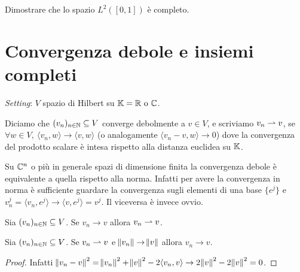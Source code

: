 \begin{exercise}
    Dimostrare che lo spazio $ L^2([0, 1]) $ è completo.
\end{exercise}

%
%

\section{Convergenza debole e insiemi completi}
\emph{Setting}: $ V $ spazio di Hilbert su $ \mathbb{K} = \mathbb{R} \text{ o } \mathbb{C} $.

\begin{definition}
    Diciamo che $ (v_n)_{n \in \mathbb{N}} \subseteq V $ converge debolmente a $ v \in V $, e scriviamo $ v_n \rightharpoonup v $, se $ \forall w \in V, \ {\langle v_n, w \rangle} \to {\langle v, w \rangle} $ (o analogamente $ {\langle v_n - v, w \rangle} \to 0 $) dove la convergenza del prodotto scalare è intesa rispetto alla distanza euclidea su $ \mathbb{K} $. 
\end{definition}

\begin{oss}
    Su $ \mathbb{C}^n $ o più in generale spazi di dimensione finita la convergenza debole è equivalente a quella rispetto alla norma. Infatti per avere la convergenza in norma è sufficiente guardare la convergenza sugli elementi di una base $ \{e^j\} $ e $ v_n^j = {\langle v_n, e^j\rangle} \to {\langle v, e^j\rangle} = v^j $. Il viceversa è invece ovvio.
\end{oss}

\begin{lemma}
    Sia $ (v_n)_{n \in \mathbb{N}} \subseteq V $. Se $ v_n \to v $ allora $ v_n \rightharpoonup v $.
\end{lemma}

\begin{lemma}
    Sia $ (v_n)_{n \in \mathbb{N}} \subseteq V $. Se $ v_n \rightharpoonup v $ e $ \norm{v_n} \to \norm{v} $ allora $ v_n \to v $.
\end{lemma}
\begin{proof}
    Infatti $ \norm{v_n - v}^2 = \norm{v_n}^2 + \norm{v}^2 - 2 {\langle v_n, v \rangle} \to 2\norm{v}^2 - 2\norm{v}^2 = 0 $.
\end{proof}

